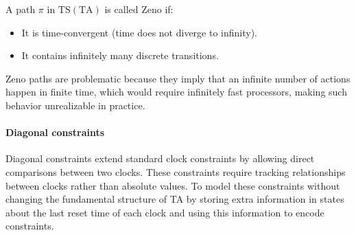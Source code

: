 \begin{definition}
    A path $\pi$ in $\text{TS}(\text{TA})$ is called Zeno if:
    \begin{itemize}
        \item It is time-convergent (time does not diverge to infinity).
        \item It contains infinitely many discrete transitions.
    \end{itemize}
\end{definition}
\noindent Zeno paths are problematic because they imply that an infinite number of actions happen in finite time, which would require infinitely fast processors, making such behavior unrealizable in practice.

\paragraph*{Diagonal constraints}
Diagonal constraints extend standard clock constraints by allowing direct comparisons between two clocks. 
These constraints require tracking relationships between clocks rather than absolute values.
To model these constraints without changing the fundamental structure of TA by storing extra information in states about the last reset time of each clock and using this information to encode constraints. 